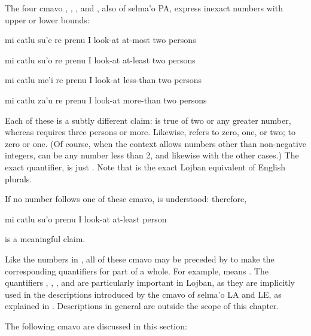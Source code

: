 The four cmavo , , , and ,
    also of selma'o PA, express inexact numbers with upper or lower
    bounds:
\begin{example}
mi catlu su'e re prenu\n
I look-at at-most two persons
\end{example}

\begin{example}
mi catlu su'o re prenu\n
I look-at at-least two persons
\end{example}

\begin{example}
mi catlu me'i re prenu\n
I look-at less-than two persons
\end{example}

\begin{example}
mi catlu za'u re prenu\n
I look-at more-than two persons
\end{example}

Each of these is a subtly different claim:  is true of two or any greater
    number, whereas  requires three
    persons or more. Likewise, 
    refers to zero, one, or two;  to
    zero or one. (Of course, when the context allows numbers other
    than non-negative integers,  can be any number less
    than 2, and likewise with the other cases.) The exact
    quantifier,  is just
    . Note that  is the exact Lojban equivalent of
    English plurals. 

If no number follows one of these cmavo,  is
    understood: therefore,
\begin{example}
mi catlu su'o prenu\n
I look-at at-least  person
\end{example}

{\noindent}is a meaningful claim. 

Like the numbers in , all of
    these cmavo may be preceded by  to make the corresponding
    quantifiers for part of a whole. For example,  means
    . The quantifiers , ,
    , and  are particularly important in Lojban,
    as they are implicitly used in the descriptions introduced by
    the cmavo of selma'o LA and LE, as explained in . Descriptions in general are
    outside the scope of this chapter.



The following cmavo are discussed in this section:

